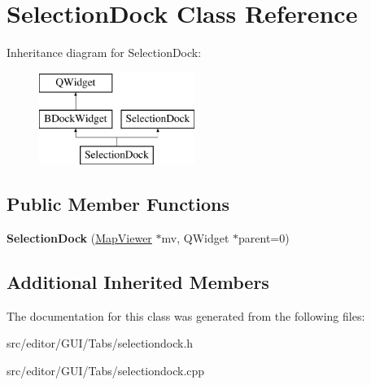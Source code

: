 \hypertarget{class_selection_dock}{}\section{Selection\+Dock Class Reference}
\label{class_selection_dock}
Inheritance diagram for Selection\+Dock\+:\begin{figure}[H]
\begin{center}
\leavevmode
\includegraphics[height=3.000000cm]{class_selection_dock}
\end{center}
\end{figure}
\subsection*{Public Member Functions}
\begin{DoxyCompactItemize}
\item 
\hypertarget{class_selection_dock_a91607ae2abc9aabc3fecfdd10c08571c}{}\label{class_selection_dock_a91607ae2abc9aabc3fecfdd10c08571c} 
{\bfseries Selection\+Dock} (\hyperlink{class_map_viewer}{Map\+Viewer} $\ast$mv, Q\+Widget $\ast$parent=0)
\end{DoxyCompactItemize}
\subsection*{Additional Inherited Members}


The documentation for this class was generated from the following files\+:\begin{DoxyCompactItemize}
\item 
src/editor/\+G\+U\+I/\+Tabs/selectiondock.\+h\item 
src/editor/\+G\+U\+I/\+Tabs/selectiondock.\+cpp\end{DoxyCompactItemize}
